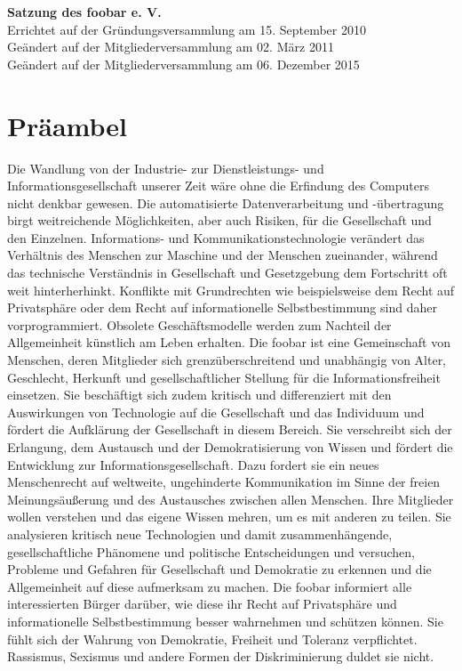 \documentclass[10pt,a4paper]{scrartcl}
\begin{document}
\noindent
{\huge\bfseries Satzung des foobar e. V.}\\[0.5cm]
Errichtet auf der Gründungsversammlung am 15. September 2010\\
Geändert auf der Mitgliederversammlung am 02. März 2011\\
Geändert auf der Mitgliederversammlung am 06. Dezember 2015


\section*{Präambel}

Die Wandlung von der Industrie- zur Dienstleistungs- und
Informationsgesellschaft unserer Zeit wäre ohne die Erfindung des
Computers nicht denkbar gewesen. Die automatisierte Datenverarbeitung
und -übertragung birgt weitreichende Möglichkeiten, aber auch Risiken,
für die Gesellschaft und den Einzelnen. Informations- und
Kommunikationstechnologie verändert das Verhältnis des Menschen zur
Maschine und der Menschen zueinander, während das technische
Verständnis in Gesellschaft und Gesetzgebung dem Fortschritt oft weit
hinterherhinkt.  Konflikte mit Grundrechten wie beispielsweise dem
Recht auf Privatsphäre oder dem Recht auf informationelle
Selbstbestimmung sind daher vorprogrammiert.  Obsolete
Geschäftsmodelle werden zum Nachteil der Allgemeinheit künstlich am
Leben erhalten. Die foobar ist eine Gemeinschaft von Menschen, deren
Mitglieder sich grenzüberschreitend und unabhängig von Alter,
Geschlecht, Herkunft und gesellschaftlicher Stellung für die
Informationsfreiheit einsetzen. Sie beschäftigt sich zudem kritisch
und differenziert mit den Auswirkungen von Technologie auf die
Gesellschaft und das Individuum und fördert die Aufklärung der
Gesellschaft in diesem Bereich.  Sie verschreibt sich der Erlangung,
dem Austausch und der Demokratisierung von Wissen und fördert die
Entwicklung zur Informationsgesellschaft. Dazu fordert sie ein neues
Menschenrecht auf weltweite, ungehinderte Kommunikation im Sinne der
freien Meinungsäußerung und des Austausches zwischen allen
Menschen. Ihre Mitglieder wollen verstehen und das eigene Wissen
mehren, um es mit anderen zu teilen. Sie analysieren kritisch neue
Technologien und damit zusammenhängende, gesellschaftliche Phänomene
und politische Entscheidungen und versuchen, Probleme und Gefahren für
Gesellschaft und Demokratie zu erkennen und die Allgemeinheit auf
diese aufmerksam zu machen.  Die foobar informiert alle interessierten
Bürger darüber, wie diese ihr Recht auf Privatsphäre und
informationelle Selbstbestimmung besser wahrnehmen und schützen
können. Sie fühlt sich der Wahrung von Demokratie, Freiheit und
Toleranz verpflichtet. Rassismus, Sexismus und andere Formen der
Diskriminierung duldet sie nicht.
\end{document}
